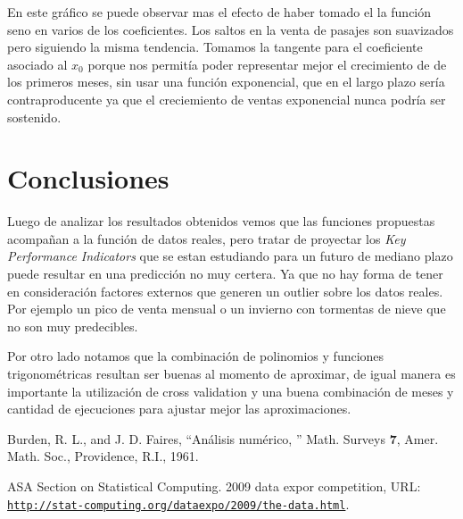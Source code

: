 \documentclass{endm}
\begin{document}
En este gr\'afico se puede observar mas el efecto de haber tomado el la funci\'on seno en varios de los coeficientes. Los saltos en la venta de pasajes son suavizados pero siguiendo la misma tendencia. Tomamos la tangente para el coeficiente asociado al $x_0$ porque nos permit\'ia poder representar mejor el crecimiento de de los primeros meses, sin usar una funci\'on exponencial, que en el largo plazo ser\'ia contraproducente ya que el creciemiento de ventas exponencial nunca podr\'ia ser sostenido.



\section{Conclusiones}

Luego de analizar los resultados obtenidos vemos que las funciones propuestas acompa\~nan a la funci\'on de datos reales, pero tratar de proyectar los \textit{Key Performance Indicators} que se estan estudiando para un futuro de mediano plazo puede resultar en una predicci\'on no muy certera. Ya que no hay forma de tener en consideraci\'on factores externos que generen un outlier sobre los datos reales. Por ejemplo un pico de venta mensual o un invierno con tormentas de nieve que no son muy predecibles.

Por otro lado notamos que la combinaci\'on de polinomios y funciones trigonom\'etricas resultan ser buenas al momento de aproximar, de igual manera es importante la utilizaci\'on de cross validation y una buena combinaci\'on de meses y cantidad de ejecuciones para ajustar mejor las aproximaciones.


\begin{thebibliography}{10}\label{bibliography}
  
 Burden, R. L., and J. D. Faires, ``An\'alisis num\'erico,
'' Math. Surveys \textbf{7}, Amer. Math. Soc.,
  Providence, R.I., 1961.
  
 ASA Section on Statistical Computing. 2009 data expor competition, URL:
  \href{http://stat-computing.org/dataexpo/2009/the-data.html}
  {\texttt{http://stat-computing.org/dataexpo/2009/the-data.html}}.

\end{thebibliography}
\end{document}
